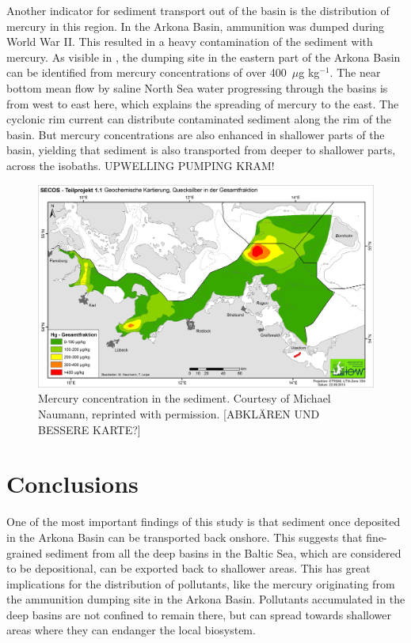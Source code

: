Another indicator for sediment transport out of the basin is the distribution 
of mercury in this region. In the Arkona Basin, ammunition was dumped during 
World War II. This resulted in a heavy contamination of the sediment with 
mercury. As visible in , the dumping site in the eastern part of the 
Arkona Basin can be identified from mercury concentrations of over 400~$\mu$g 
kg$^{-1}$. The near bottom mean flow by saline North Sea water progressing 
through the basins is from west to east here, which explains the spreading of 
mercury to the east. The cyclonic rim current can distribute contaminated 
sediment along the rim of the basin. But mercury concentrations 
are also enhanced in shallower parts of the basin, yielding that sediment is 
also transported from deeper to shallower parts, across the isobaths. UPWELLING 
PUMPING KRAM!
   \begin{figure}[ht]
\includegraphics[width=15cm]{bilder/HG_GF.jpg}
 \caption{Mercury concentration in the sediment. Courtesy of Michael Naumann, 
reprinted with permission. [ABKLÄREN UND BESSERE KARTE?]}
 \label{hg}
 \end{figure}
 
\section{Conclusions}

One of the most important findings of this study is that sediment once 
deposited in the Arkona Basin can be transported back onshore. 
This suggests that fine-grained sediment from all the deep basins in the Baltic 
Sea, which are considered to be depositional, can be exported back to 
shallower areas. This has great implications for the distribution of 
pollutants, 
like the mercury originating from the ammunition dumping site in the Arkona 
Basin. Pollutants accumulated in the deep basins are not confined to remain 
there, but can spread towards shallower areas where they can endanger the local 
biosystem.

